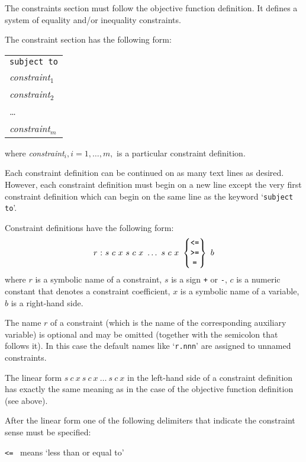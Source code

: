 The constraints section must follow the objective function definition.
It defines a system of equality and/or inequality constraints.

The constraint section has the following form:

\begin{center}
\begin{tabular}{l}
\verb|subject to| \\
{\it constraint}$_1$ \\
{\it constraint}$_2$ \\
\hspace{20pt}\dots \\
{\it constraint}$_m$ \\
\end{tabular}
\end{center}

\noindent where {\it constraint}$_i, i=1,\dots,m,$ is a particular
constraint definition.

Each constraint definition can be continued on as many text lines as
desired. However, each constraint definition must begin on a new line
except the very first constraint definition which can begin on the same
line as the keyword `\verb|subject to|'.

Constraint definitions have the following form:
$$
r\ {\tt:}\ s\ c\ x\ s\ c\ x\ \dots\ s\ c\ x
\ \left\{
\begin{array}{@{}c@{}}
\mbox{\tt<=} \\ \mbox{\tt>=} \\ \mbox{\tt=}
\end{array}
\right\}\ b
$$
where $r$ is a symbolic name of a constraint, $s$ is a sign \verb|+| or
\verb|-|, $c$ is a numeric constant that denotes a constraint
coefficient, $x$ is a symbolic name of a variable, $b$ is a right-hand
side.

The name $r$ of a constraint (which is the name of the corresponding
auxiliary variable) is optional and may be omitted (together with the
semicolon that follows it). In this case the default names like
`\verb|r.nnn|' are assigned to unnamed constraints.

The linear form $s\ c\ x\ s\ c\ x\ \dots\ s\ c\ x$ in the left-hand
side of a constraint definition has exactly the same meaning as in the
case of the objective function definition (see above).

After the linear form one of the following delimiters that indicate
the constraint sense must be specified:

\verb|<=| \ means `less than or equal to'

